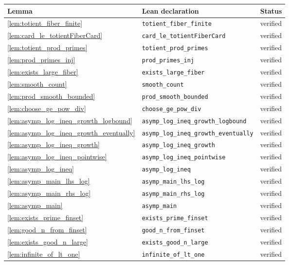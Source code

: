 \documentclass[11pt]{article}
\theoremstyle{definition}
\theoremstyle{remark}
\begin{document}
\begin{longtable}{@{}lll@{}}
\toprule
Lemma & Lean declaration & Status \\
\midrule
\endhead
\cref{lem:totient_fiber_finite} & \texttt{totient\_fiber\_finite} & verified \\
\cref{lem:card_le_totientFiberCard} & \texttt{card\_le\_totientFiberCard} & verified \\
\cref{lem:totient_prod_primes} & \texttt{totient\_prod\_primes} & verified \\
\cref{lem:prod_primes_inj} & \texttt{prod\_primes\_inj} & verified \\
\cref{lem:exists_large_fiber} & \texttt{exists\_large\_fiber} & verified \\
\cref{lem:smooth_count} & \texttt{smooth\_count} & verified \\
\cref{lem:prod_smooth_bounded} & \texttt{prod\_smooth\_bounded} & verified \\
\cref{lem:choose_ge_pow_div} & \texttt{choose\_ge\_pow\_div} & verified \\
\cref{lem:asymp_log_ineq_growth_logbound} & \texttt{asymp\_log\_ineq\_growth\_logbound} & verified \\
\cref{lem:asymp_log_ineq_growth_eventually} & \texttt{asymp\_log\_ineq\_growth\_eventually} & verified \\
\cref{lem:asymp_log_ineq_growth} & \texttt{asymp\_log\_ineq\_growth} & verified \\
\cref{lem:asymp_log_ineq_pointwise} & \texttt{asymp\_log\_ineq\_pointwise} & verified \\
\cref{lem:asymp_log_ineq} & \texttt{asymp\_log\_ineq} & verified \\
\cref{lem:asymp_main_lhs_log} & \texttt{asymp\_main\_lhs\_log} & verified \\
\cref{lem:asymp_main_rhs_log} & \texttt{asymp\_main\_rhs\_log} & verified \\
\cref{lem:asymp_main} & \texttt{asymp\_main} & verified \\
\cref{lem:exists_prime_finset} & \texttt{exists\_prime\_finset} & verified \\
\cref{lem:good_n_from_finset} & \texttt{good\_n\_from\_finset} & verified \\
\cref{lem:exists_good_n_large} & \texttt{exists\_good\_n\_large} & verified \\
\cref{lem:infinite_of_lt_one} & \texttt{infinite\_of\_lt\_one} & verified \\
\bottomrule
\end{longtable}
\end{document}
